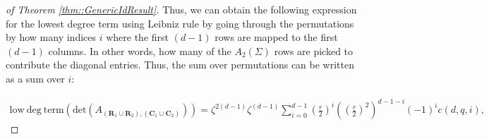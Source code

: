 \documentclass{biometrika}
\begin{document}
\begin{proof}[of Theorem \ref{thm::GenericIdResult}]

Thus, we can obtain the following expression for the lowest degree term using Leibniz rule by going through the permutations by how many indices $i$ where the first $(d-1)$ rows are mapped to the first $(d-1)$ columns. In other words, how many of the $A_2(\Sigma)$ rows are picked to contribute the diagonal entries. Thus, the sum over permutations can be written as a sum over $i$:



\begin{align*}
    \mathrm{low\ deg\ term}( \mathrm{det}(A_{(\mathbf{R}_1 \cup \mathbf{R}_2), (\mathbf{C}_1 \cup \mathbf{C}_2)})) = \zeta^{2(d-1)} \zeta^{(d-1)}  \sum_{i = 0}^{d-1}  \left(\frac{r}{2} \right)^{i}  \left( \left(\frac{r}{2} \right)^2 \right)^{d-1-i} (-1)^{i} c(d,q,i),
\end{align*}


\end{proof}
\end{document}
